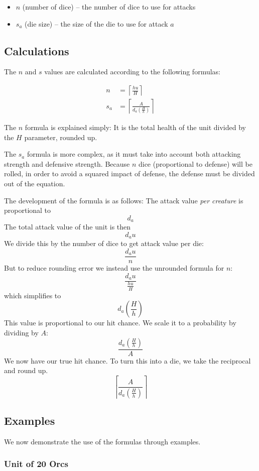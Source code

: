\documentclass{article}
\begin{document}
\begin{itemize}
    \item $n$ (number of dice) -- the number of dice to use for attacks
    \item $s_a$ (die size) -- the size of the die to use for attack $a$
\end{itemize}

\subsection{Calculations}

The $n$ and $s$ values are calculated according to the following formulas:

\begin{align*}
    n   &=  \left\lceil\frac{hu}{H}\right\rceil \\
    s_a &=  \left\lceil\frac{A}{d_a(\frac{H}{h})}\right\rceil
\end{align*}

The $n$ formula is explained simply:
It is the total health of the unit divided by the $H$ parameter,
rounded up.

The $s_a$ formula is more complex,
as it must take into account both attacking strength and defensive strength.
Because $n$ dice (proportional to defense) will be rolled,
in order to avoid a squared impact of defense,
the defense must be divided out of the equation.

The development of the formula is as follows:
The attack value \emph{per creature} is proportional to 
\[
    d_a
\]
The total attack value of the unit is then 
\[
    d_a u
\]
We divide this by the number of dice to get attack value per die: 
\[
    \frac{d_a u}{n}
\]
But to reduce rounding error we instead use the unrounded formula for $n$: 
\[
    \frac{d_a u}{\frac{hu}{H}}
\]
which simplifies to 
\[
    d_a\left(\frac{H}{h}\right)
\]
This value is proportional to our hit chance.
We scale it to a probability by dividing by $A$:
\[
    \frac{d_a(\frac{H}{h})}{A}
\]
We now have our true hit chance.
To turn this into a die, we take the reciprocal and round up.
\[
    \left\lceil\frac{A}{d_a(\frac{H}{h})}\right\rceil
\]

\subsection{Examples}

We now demonstrate the use of the formulas through examples.

\subsubsection{Unit of 20 Orcs}
\end{document}
